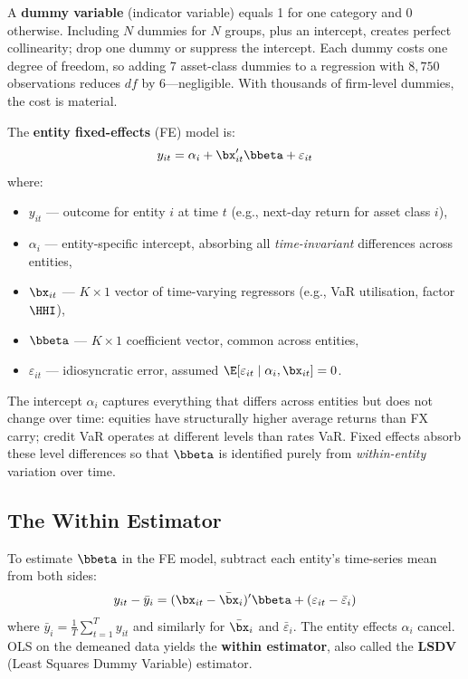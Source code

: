 \begin{prereq}
A \textbf{dummy variable} (indicator variable) equals 1 for one category and 0 otherwise.
Including $N$ dummies for $N$ groups, plus an intercept, creates perfect collinearity; drop one dummy or suppress the intercept.
Each dummy costs one degree of freedom, so adding 7 asset-class dummies to a regression with $8{,}750$ observations reduces $df$ by 6---negligible.
With thousands of firm-level dummies, the cost is material.
\end{prereq}

\begin{definition}
The \textbf{entity fixed-effects} (FE) model is:
\begin{equation}
  y_{it} = \alpha_i + \bx_{it}'\bbeta + \varepsilon_{it}
  \label{eq:fe-model}
\end{equation}
where:
\begin{itemize}[leftmargin=*]
  \item $y_{it}$ --- outcome for entity $i$ at time $t$ (e.g., next-day return for asset class $i$),
  \item $\alpha_i$ --- entity-specific intercept, absorbing all \emph{time-invariant} differences across entities,
  \item $\bx_{it}$ --- $K \times 1$ vector of time-varying regressors (e.g., VaR utilisation, factor $\HHI$),
  \item $\bbeta$ --- $K \times 1$ coefficient vector, common across entities,
  \item $\varepsilon_{it}$ --- idiosyncratic error, assumed $\E[\varepsilon_{it} \mid \alpha_i, \bx_{it}] = 0$.
\end{itemize}
\end{definition}

The intercept $\alpha_i$ captures everything that differs across entities but does not change over time: equities have structurally higher average returns than FX carry; credit VaR operates at different levels than rates VaR.
Fixed effects absorb these level differences so that $\bbeta$ is identified purely from \emph{within-entity} variation over time.

\subsection{The Within Estimator}

\begin{keyidea}
To estimate $\bbeta$ in the FE model, subtract each entity's time-series mean from both sides:
\begin{equation}
  y_{it} - \bar{y}_i = (\bx_{it} - \bar{\bx}_i)'\bbeta + (\varepsilon_{it} - \bar{\varepsilon}_i)
  \label{eq:within-estimator}
\end{equation}
where $\bar{y}_i = \frac{1}{T}\sum_{t=1}^{T} y_{it}$ and similarly for $\bar{\bx}_i$ and $\bar{\varepsilon}_i$.
The entity effects $\alpha_i$ cancel.
OLS on the demeaned data yields the \textbf{within estimator}, also called the \textbf{LSDV} (Least Squares Dummy Variable) estimator.
\end{keyidea}


